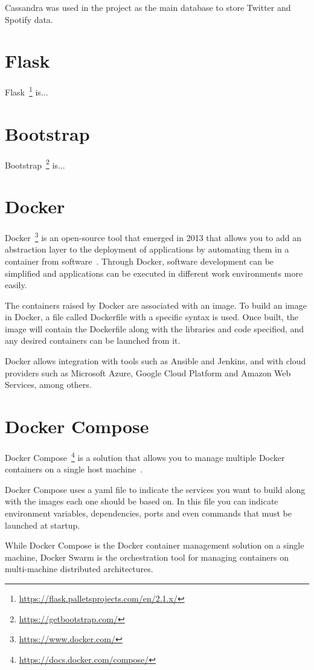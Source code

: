 \nonzeroparskip Cassandra was used in the project as the main database to store Twitter and Spotify data.

\section{Flask}

\nonzeroparskip Flask~\footnote{\url{https://flask.palletsprojects.com/en/2.1.x/}} is...

\section{Bootstrap}

\nonzeroparskip Bootstrap~\footnote{\url{https://getbootstrap.com/}} is...

\section{Docker}

\nonzeroparskip Docker~\footnote{\url{https://www.docker.com/}} is an open-source tool that emerged in 2013 that allows you to add an abstraction layer to the deployment of applications by automating them in a container from software~\cite{docker}. Through Docker, software development can be simplified and applications can be executed in different work environments more easily.

\nonzeroparskip The containers raised by Docker are associated with an image. To build an image in Docker, a file called Dockerfile with a specific syntax is used. Once built, the image will contain the Dockerfile along with the libraries and code specified, and any desired containers can be launched from it.

\nonzeroparskip Docker allows integration with tools such as Ansible and Jenkins, and with cloud providers such as Microsoft Azure, Google Cloud Platform and Amazon Web Services, among others.

\section{Docker Compose}

\nonzeroparskip Docker Compose~\footnote{\url{https://docs.docker.com/compose/}} is a solution that allows you to manage multiple Docker containers on a single host machine~\cite{docker_compose}.

\nonzeroparskip Docker Compose uses a yaml file to indicate the services you want to build along with the images each one should be based on. In this file you can indicate environment variables, dependencies, ports and even commands that must be launched at startup.

\nonzeroparskip While Docker Compose is the Docker container management solution on a single machine, Docker Swarm is the orchestration tool for managing containers on multi-machine distributed architectures.
